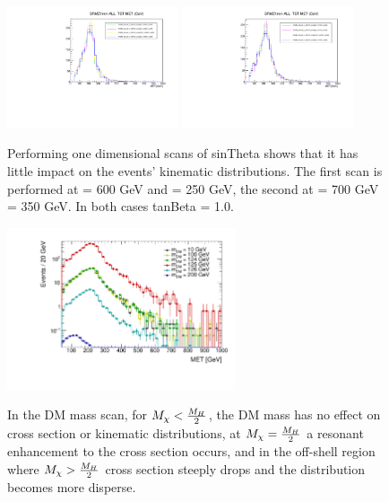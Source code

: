 \begin{figure}
\includegraphics[width=0.45\textwidth]{texinputs/04_grid/figures/monoz/leptonic/SinThetaScan_mH600ma250_MET.pdf}
\includegraphics[width=0.45\textwidth]{texinputs/04_grid/figures/monoz/leptonic/SinThetaScan_mH700ma350_MET.pdf}
\caption{Performing one dimensional scans of sinTheta shows that it has little impact on the events' kinematic distributions.  The first scan is performed at \mA = 600 GeV and \ma = 250 GeV, the second at \mA = 700 GeV \ma = 350 GeV.  In both cases tanBeta = 1.0.}
\end{figure}


\begin{figure}
\includegraphics[width=0.6\textwidth]{texinputs/04_grid/figures/monoz/leptonic/dm_scan_met_ll.pdf}
\label{fig:dm_scan_ll}
\caption{In the DM mass scan, for $M_{\chi} < \frac{M_{H}}{2}$, the DM mass has no effect on cross section or kinematic distributions, at $M_{\chi} = \frac{M_{H}}{2}$ a resonant enhancement to the cross section occurs, and in the off-shell region where  $M_{\chi} > \frac{M_{H}}{2}$ cross section steeply drops and the \MET distribution becomes more disperse.}
\end{figure}


